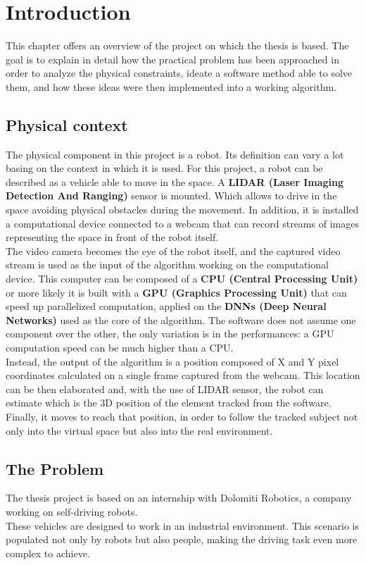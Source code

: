 \chapter{Introduction} \label{cha:introduction}
This chapter offers an overview of the project on which the thesis is based. The goal is to explain in detail how the practical problem has been approached in order to analyze the physical constraints, ideate a software method able to solve them, and how these ideas were then implemented into a working algorithm. 


\section{Physical context}
The physical component in this project is a robot. Its definition can vary a lot basing on the context in which it is used. For this project, a robot can be described as a vehicle able to move in the space. A \textbf{LIDAR (Laser Imaging Detection And Ranging)} sensor is mounted. Which allows to drive in the space avoiding physical obstacles during the movement. In addition, it is installed a computational device connected to a webcam that can record streams of images representing the space in front of the robot itself.\\
The video camera becomes the eye of the robot itself, and the captured video stream is used as the input of the algorithm working on the computational device. This computer can be composed of a \textbf{CPU (Central Processing Unit)} or more likely it is built with a \textbf{GPU (Graphics Processing Unit)} that can speed up parallelized computation, applied on the \textbf{DNNs (Deep Neural Networks)} used as the core of the algorithm. The software does not assume one component over the other, the only variation is in the performances: a GPU computation speed can be much higher than a CPU.\\
Instead, the output of the algorithm is a position composed of X and Y pixel coordinates calculated on a single frame captured from the webcam. This location can be then elaborated and, with the use of LIDAR sensor, the robot can estimate which is the 3D position of the element tracked from the software.\\
Finally, it moves to reach that position, in order to follow the tracked subject not only into the virtual space but also into the real environment.


\section{The Problem}
The thesis project\cite{projectSourceCode} is based on an internship with Dolomiti Robotics\cite{dolomitiRobotics}, a company working on self-driving robots.\\
These vehicles are designed to work in an industrial environment. This scenario is populated not only by robots but also people, making the driving task even more complex to achieve.

